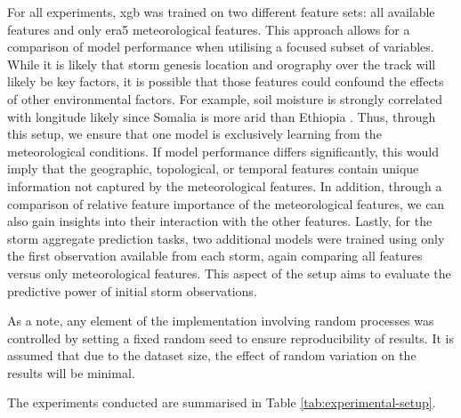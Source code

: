 For all experiments, \acrshort{xgb} was trained on two different feature sets: all available features and only \acrshort{era5} meteorological features. This approach allows for a comparison of model performance when utilising a focused subset of variables. While it is likely that storm genesis location and orography over the track will likely be key factors, it is possible that those features could confound the effects of other environmental factors. For example, soil moisture is strongly correlated with longitude likely since Somalia is more arid than Ethiopia . Thus, through this setup, we ensure that one model is exclusively learning from the meteorological conditions. If model performance differs significantly, this would imply that the geographic, topological, or temporal features contain unique information not captured by the meteorological features. In addition, through a comparison of relative feature importance of the meteorological features, we can also gain insights into their interaction with the other features. Lastly, for the storm aggregate prediction tasks, two additional models were trained using only the first observation available from each storm, again comparing all features versus only meteorological features. This aspect of the setup aims to evaluate the predictive power of initial storm observations.

As a note, any element of the implementation involving random processes was controlled by setting a fixed random seed to ensure reproducibility of results. It is assumed that due to the dataset size, the effect of random variation on the results will be minimal.

The experiments conducted are summarised in Table \ref{tab:experimental-setup}.


